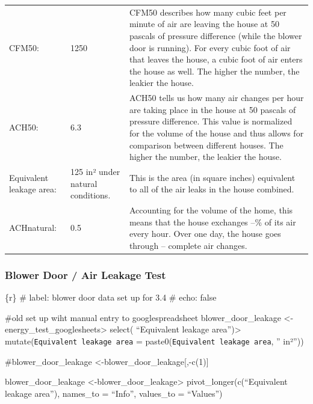 \documentclass[
  letterpaper,
  DIV=11,
  numbers=noendperiod]{scrartcl}
\begin{document}
\begin{table}
\fontsize{8.2pt}{9.9pt}\selectfont
\begin{tabular*}{\linewidth}{@{\extracolsep{\fill}}lll}
\toprule
 &  &  \\ 
\midrule\addlinespace[2.5pt]
CFM50: & 1250 & CFM50 describes how many cubic feet per minute of air are leaving the house at 50 pascals of pressure difference (while the blower door is running). For every cubic foot of air that leaves the house, a cubic foot of air enters the house as well. The higher the number, the leakier the house. \\ 
ACH50: & 6.3 & ACH50 tells us how many air changes per hour are taking place in the house at 50 pascals of pressure difference. This value is normalized for the volume of the house and thus allows for comparison between different houses. The higher the number, the leakier the house. \\ 
Equivalent leakage area: & 125 in² under natural conditions. & This is the area (in square inches) equivalent to all of the air leaks in the house combined. \\ 
ACHnatural: & 0.5 & Accounting for the volume of the home, this means that the house exchanges –\% of its air every hour. Over one day, the house goes through – complete air changes. \\ 
\bottomrule
\end{tabular*}
\end{table}

\subsubsection{Blower Door / Air Leakage
Test}\label{blower-door-air-leakage-test-1}

\{r\} \#\textbar{} label: blower door data set up for 3.4 \#\textbar{}
echo: false

\#old set up wiht manual entry to googlespreadsheet
blower\_door\_leakage \textless-
energy\_test\_googlesheets\textbar\textgreater{} select( ``Equivalent
leakage area'')\textbar\textgreater{}
mutate(\texttt{Equivalent\ leakage\ area} =
paste0(\texttt{Equivalent\ leakage\ area}, '' in²''))

\#blower\_door\_leakage \textless-blower\_door\_leakage{[},-c(1){]}

blower\_door\_leakage
\textless-blower\_door\_leakage\textbar\textgreater{}
pivot\_longer(c(``Equivalent leakage area''), names\_to = ``Info'',
values\_to = ``Values'')
\end{document}
